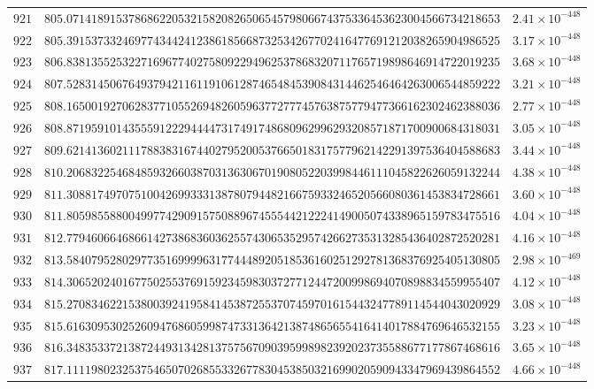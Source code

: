 \documentclass[12pt,reqno]{amsart}
\theoremstyle{remark}
\begin{document}
\begin{longtable}{clc}
$921$ & $805.0714189153786862205321582082650654579806674375336453623004566734218653$ & $2.41\times 10^{-448}$ \\
$922$ & $805.3915373324697743442412386185668732534267702416477691212038265904986525$ & $3.17\times 10^{-448}$ \\
$923$ & $806.8381355253227169677402758092294962537868320711765719898646914722019235$ & $3.68\times 10^{-448}$ \\
$924$ & $807.5283145067649379421161191061287465484539084314462546464263006544859222$ & $3.21\times 10^{-448}$ \\
$925$ & $808.1650019270628377105526948260596377277745763875779477366162302462388036$ & $2.77\times 10^{-448}$ \\
$926$ & $808.8719591014355591222944447317491748680962996293208571871700900684318031$ & $3.05\times 10^{-448}$ \\
$927$ & $809.6214136021117883831674402795200537665018317577962142291397536404588683$ & $3.44\times 10^{-448}$ \\
$928$ & $810.2068322546848593266038703136306701908052203998446111045822626059132244$ & $4.38\times 10^{-448}$ \\
$929$ & $811.3088174970751004269933313878079448216675933246520566080361453834728661$ & $3.60\times 10^{-448}$ \\
$930$ & $811.8059855880049977429091575088967455544212224149005074338965159783475516$ & $4.04\times 10^{-448}$ \\
$931$ & $812.7794606646866142738683603625574306535295742662735313285436402872520281$ & $4.16\times 10^{-448}$ \\
$932$ & $813.5840795280297735169999631774448920518536160251292781368376925405130805$ & $2.98\times 10^{-469}$ \\
$933$ & $814.3065202401677502553769159234598303727712447200998694070898834559955407$ & $4.12\times 10^{-448}$ \\
$934$ & $815.2708346221538003924195841453872553707459701615443247789114544043020929$ & $3.08\times 10^{-448}$ \\
$935$ & $815.6163095302526094768605998747331364213874865655416414017884769646532155$ & $3.23\times 10^{-448}$ \\
$936$ & $816.3483533721387244931342813757567090395998982392023735588677177867468616$ & $3.65\times 10^{-448}$ \\
$937$ & $817.1111980232537546507026855332677830453850321699020590943347969439864552$ & $4.66\times 10^{-448}$ \\

\end{longtable}
\end{document}
